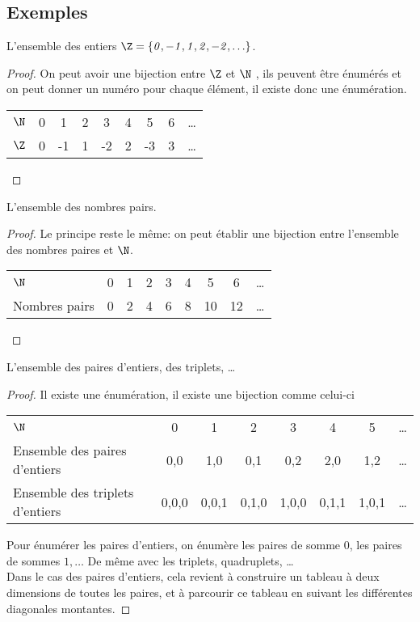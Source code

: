 \subsection{Exemples}
\label{subsec:exemples}

\begin{myexem}
  L'ensemble des entiers $\mathit{\Z=\{0,-1,1,2,-2,\ldots\}}$.
  \begin{proof}
     On peut avoir une bijection entre $\Z$ et $\N$ , ils peuvent être énumérés et on peut donner un numéro pour chaque élément, il existe donc une énumération. 
  
  \begin{tabular}{ l | c c c c c c c r }
     $\N$ & 0 & 1 & 2  & 3 & 4 & 5 & 6 & \ldots \\
     $\Z$ & 0 & -1 & 1 & -2 & 2 & -3 & 3  & \ldots \\
    
    \end{tabular}
  \end{proof}
\end{myexem}
  
\begin{myexem}
 L'ensemble des nombres pairs.
  \begin{proof}
  Le principe reste le même: on peut établir une bijection entre l'ensemble des nombres paires et $\N$.
 
   \begin{tabular}{ l c c c c c c c r }
    $\N$ & 0 & 1 & 2  & 3 & 4 & 5 & 6 & \ldots \\
      Nombres pairs & 0 & 2 & 4 & 6 & 8 & 10 & 12  & \ldots \\
    \end{tabular}
  \end{proof} 
\end{myexem}
  
\begin{myexem}
\label{exem:paire_entiers}
  L'ensemble des paires d'entiers, des triplets, \ldots
    \begin{proof}
        Il existe une énumération, il existe une bijection comme celui-ci  
      
		\begin{tabular}{ l c c  c  c c c  r }
			$\N$  & 0 & 1 & 2  & 3 & 4 & 5 & \ldots  \\
			Ensemble des paires d'entiers & {0,0} & {1,0} & {0,1} & {0,2} & {2,0} & {1,2}  & \ldots \\
			Ensemble des triplets d'entiers & {0,0,0} & {0,0,1} & {0,1,0} & {1,0,0} & {0,1,1} & {1,0,1}  & \ldots \\
			
		\end{tabular}
	
	Pour énumérer les paires d'entiers, on énumère les paires de somme 0, les paires de sommes $1, \ldots$ De même avec les triplets, quadruplets, \dots \\
	Dans le cas des paires d'entiers, cela revient à construire un tableau à deux dimensions de toutes les paires, et à parcourir ce tableau en suivant les différentes diagonales montantes. 
    \end{proof}   
\end{myexem}
  
